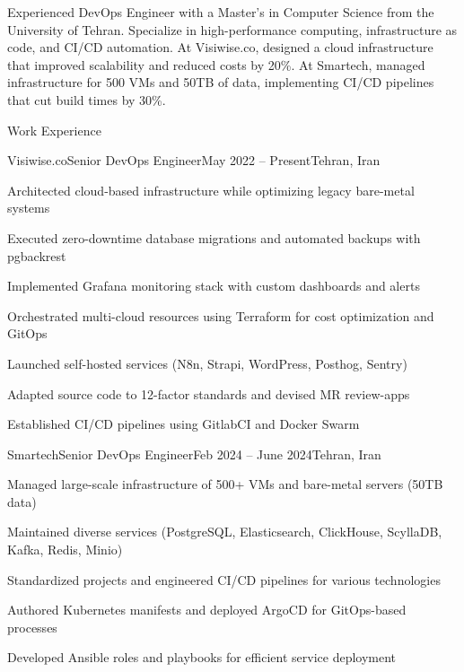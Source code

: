 \documentclass[]{main}
\begin{document}
\resumeheader
{}
{}
{}
{}
{}
{}

Experienced DevOps Engineer with a Master's in Computer Science from the University of Tehran. Specialize in high-performance computing, infrastructure as code, and CI/CD automation. At Visiwise.co, designed a cloud infrastructure that improved scalability and reduced costs by 20\%. At Smartech, managed infrastructure for 500 VMs and 50TB of data, implementing CI/CD pipelines that cut build times by 30\%.

\begin{section}{Work Experience}
 \begin{subsection}{Visiwise.co}{Senior DevOps Engineer}{May 2022 -- Present}{Tehran, Iran}
     \item Architected cloud-based infrastructure while optimizing legacy bare-metal systems
     \item Executed zero-downtime database migrations and automated backups with pgbackrest
     \item Implemented Grafana monitoring stack with custom dashboards and alerts
     \item Orchestrated multi-cloud resources using Terraform for cost optimization and GitOps
     \item Launched self-hosted services (N8n, Strapi, WordPress, Posthog, Sentry)
     \item Adapted source code to 12-factor standards and devised MR review-apps
     \item Established CI/CD pipelines using GitlabCI and Docker Swarm
 \end{subsection}

 \begin{subsection}{Smartech}{Senior DevOps Engineer}{Feb 2024 -- June 2024}{Tehran, Iran}
     \item Managed large-scale infrastructure of 500+ VMs and bare-metal servers (50TB data)
     \item Maintained diverse services (PostgreSQL, Elasticsearch, ClickHouse, ScyllaDB, Kafka, Redis, Minio)
     \item Standardized projects and engineered CI/CD pipelines for various technologies
     \item Authored Kubernetes manifests and deployed ArgoCD for GitOps-based processes
     \item Developed Ansible roles and playbooks for efficient service deployment
 \end{subsection}


\end{section}
\end{document}
